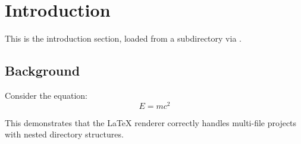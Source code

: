 \section{Introduction}
This is the introduction section, loaded from a subdirectory via \verb||.

\subsection{Background}
Consider the equation:
\begin{equation}
    E = mc^2
\end{equation}

This demonstrates that the LaTeX renderer correctly handles multi-file projects
with nested directory structures.
